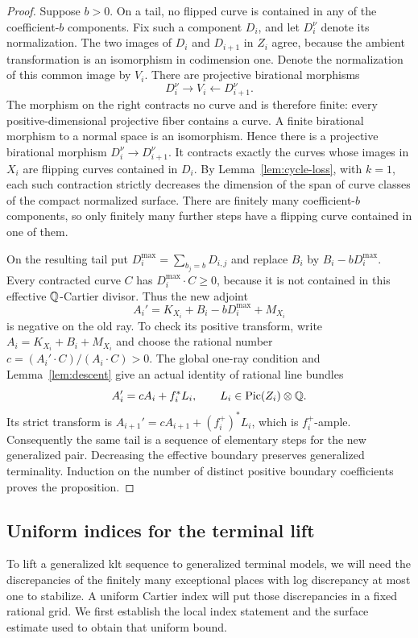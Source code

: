 \begin{proof}
Suppose $b>0$.  On a tail, no flipped curve is contained in any of the
coefficient-$b$ components.  Fix such a component $D_i$, and let
$D_i^\nu$ denote its normalization.  The two images of $D_i$ and
$D_{i+1}$ in $Z_i$ agree, because the ambient transformation is an
isomorphism in codimension one.  Denote the normalization of this common
image by $V_i$.  There are projective birational morphisms
\[
 D_i^\nu\longrightarrow V_i\longleftarrow D_{i+1}^\nu.
\]
The morphism on the right contracts no curve and is therefore finite:
every positive-dimensional projective fiber contains a curve.  A finite
birational morphism to a normal space is an isomorphism.  Hence there is a
projective birational morphism $D_i^\nu\to D_{i+1}^\nu$.  It contracts
exactly the curves whose images in $X_i$ are flipping curves contained in
$D_i$.  By Lemma~\ref{lem:cycle-loss}, with $k=1$, each such contraction
strictly decreases the dimension of the span of curve classes of the compact
normalized surface.  There are finitely many coefficient-$b$ components,
so only finitely many further steps have a flipping curve contained in one
of them.

On the resulting tail put $D_i^{\max}=\sum_{b_j=b}D_{i,j}$ and replace
$B_i$ by $B_i-bD_i^{\max}$.  Every contracted curve $C$ has
$D_i^{\max}\cdot C\geq0$, because it is not contained in this effective
$\mathbb Q$-Cartier divisor.  Thus the new adjoint
\[
 A_i'=K_{X_i}+B_i-bD_i^{\max}+M_{X_i}
\]
is negative on the old ray.  To check its positive transform, write
$A_i=K_{X_i}+B_i+M_{X_i}$ and choose the rational number
$c=(A_i'\cdot C)/(A_i\cdot C)>0$.  The global one-ray condition and
Lemma~\ref{lem:descent} give an actual identity of rational line bundles
\[
 A_i'=cA_i+f_i^*L_i,\qquad L_i\in\operatorname{Pic}(Z_i)\otimes\mathbb Q.
\]
Its strict transform is
$A_{i+1}'=cA_{i+1}+(f_i^+)^*L_i$, which is $f_i^+$-ample.
Consequently the same tail is a sequence of elementary steps for the new
generalized pair.  Decreasing the effective boundary preserves generalized
terminality.  Induction on the number of distinct positive boundary
coefficients proves the proposition.
\end{proof}

\subsection{Uniform indices for the terminal lift}

To lift a generalized klt sequence to generalized terminal models, we
will need the discrepancies of the finitely many exceptional places with
log discrepancy at most one to stabilize.  A uniform Cartier index will
put those discrepancies in a fixed rational grid.  We first establish
the local index statement and the surface estimate used to obtain that
uniform bound.

